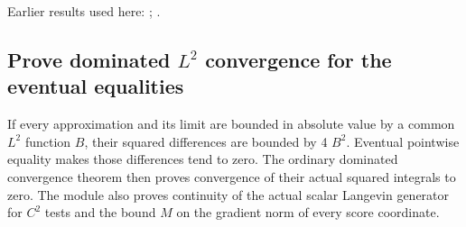 \documentclass[11pt,a4paper]{report}
\begin{document}
Earlier results used here: \cite[Section~3.46.14]{LangevinLean2026ULASC}; \cite[Section~3.46.2]{LangevinLean2026ULASC}.
\subsection{\texorpdfstring{Prove dominated \(L^{2}\) convergence for the eventual equalities}{Prove dominated L² convergence for the eventual equalities}}
\label{report-step-AverageLMC-GibbsScoreCutoff-lean-5}


If every approximation and its limit are bounded in absolute value by a common \(L^{2}\) function \(B\), their squared differences are bounded by 4 \(B^2\). Eventual pointwise equality makes those differences tend to zero. The ordinary dominated convergence theorem then proves convergence of their actual squared integrals to zero. The module also proves continuity of the actual scalar Langevin generator for \(C^{2}\) tests and the bound \(M\) on the gradient norm of every score coordinate.
\end{document}
